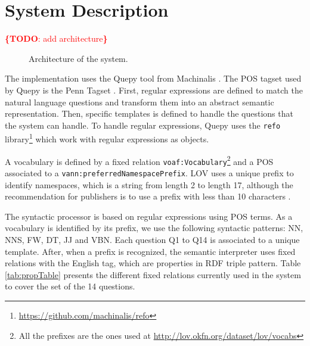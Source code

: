 \documentclass[runningheads,a4paper]{llncs}
\newcommand{\todo}[1]{\noindent\textcolor{red}{{\bf \{TODO}: #1{\bf \}}}}
\begin{document}

\section{System Description}
\label{sec:system}

\todo{add architecture}

\begin{figure}[ht!b]
\centering
\caption{Architecture of the system.}
\end{figure}

The implementation uses the Quepy tool from Machinalis \cite{quepy2012}. The POS tagset used by Quepy is the Penn Tagset \cite{marcus1993building}. First, regular expressions are defined to match the natural language questions and transform them into an abstract semantic representation. Then, specific templates is defined to handle the questions that the system can handle. To handle regular expressions, Quepy uses the \texttt{refo} library\footnote{\url{https://github.com/machinalis/refo}} which work with regular expressions as objects. 

A vocabulary is defined by a fixed relation \texttt{voaf:Vocabulary}\footnote{All the prefixes are the ones used at \url{http://lov.okfn.org/dataset/lov/vocabs}} and a POS associated to a \texttt{vann:preferredNamespacePrefix}. LOV uses a unique prefix to identify namespaces, which is a string from length 2 to length 17, although the recommendation for publishers is to use a prefix with less than 10 characters \cite{pybernard12}.  

The syntactic processor is based on regular expressions using POS terms. As a vocabulary is identified by its prefix, we use  the following syntactic patterns: NN, NNS, FW, DT, JJ and VBN. Each question Q1 to Q14 is associated to a unique template. After, when a prefix is recognized, the semantic interpreter uses fixed relations with the English tag, which are properties in RDF triple pattern. Table \ref{tab:propTable} presents the different fixed relations currently used in the system to cover the set of the 14 questions.
\end{document}

